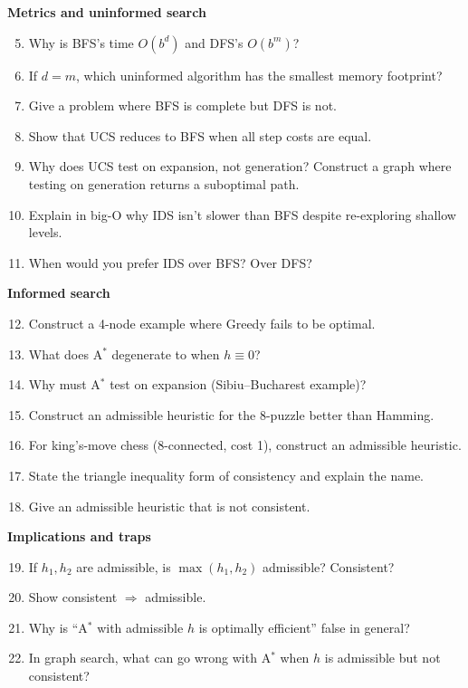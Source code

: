 \documentclass[11pt, a4paper]{article}
\begin{document}
\textbf{Metrics and uninformed search}
\begin{enumerate}\setcounter{enumi}{4}
  \item Why is BFS's time $O(b^d)$ and DFS's $O(b^m)$?
  \item If $d = m$, which uninformed algorithm has the smallest memory footprint?
  \item Give a problem where BFS is complete but DFS is not.
  \item Show that UCS reduces to BFS when all step costs are equal.
  \item Why does UCS test on expansion, not generation? Construct a graph where testing on generation returns a suboptimal path.
  \item Explain in big-O why IDS isn't slower than BFS despite re-exploring shallow levels.
  \item When would you prefer IDS over BFS? Over DFS?
\end{enumerate}

\textbf{Informed search}
\begin{enumerate}\setcounter{enumi}{11}
  \item Construct a 4-node example where Greedy fails to be optimal.
  \item What does A$^{*}$ degenerate to when $h \equiv 0$?
  \item Why must A$^{*}$ test on expansion (Sibiu--Bucharest example)?
  \item Construct an admissible heuristic for the 8-puzzle better than Hamming.
  \item For king's-move chess (8-connected, cost 1), construct an admissible heuristic.
  \item State the triangle inequality form of consistency and explain the name.
  \item Give an admissible heuristic that is not consistent.
\end{enumerate}

\textbf{Implications and traps}
\begin{enumerate}\setcounter{enumi}{18}
  \item If $h_1, h_2$ are admissible, is $\max(h_1, h_2)$ admissible? Consistent?
  \item Show consistent $\Rightarrow$ admissible.
  \item Why is ``A$^{*}$ with admissible $h$ is optimally efficient'' false in general?
  \item In graph search, what can go wrong with A$^{*}$ when $h$ is admissible but not consistent?
\end{enumerate}
\end{document}
